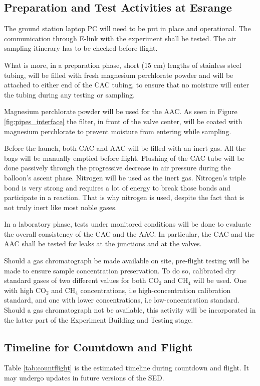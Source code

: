 \documentclass[a4paper,12pt,twoside]{article}
\begin{document}
\subsection{Preparation and Test Activities at Esrange}
The ground station laptop PC will need to be put in place and operational. The communication through E-link with the experiment shall be tested. The air sampling itinerary has to be checked before flight.

What is more, in a preparation phase, short (15 cm) lengths of stainless steel tubing, will be filled with fresh magnesium perchlorate powder \cite{Karion} and will be attached to either end of the CAC tubing, to ensure that no moisture will enter the tubing during any testing or sampling.

Magnesium perchlorate powder will be used for the AAC. As seen in Figure \ref{fig:pipes_interface} the filter, in front of the valve center, will be coated with magnesium perchlorate to prevent moisture from entering while sampling. 

Before the launch, both CAC and AAC will be filled with  an inert gas. All the bags will be manually emptied before flight. Flushing of the CAC tube will be done passively through the progressive decrease in air pressure during the balloon's ascent phase. Nitrogen will be used as the inert gas. Nitrogen's triple bond is very strong and requires a lot of energy to break those bonds and participate in a reaction. That is why nitrogen is used, despite the fact that is not truly inert like most noble gases.

In a laboratory phase, tests under monitored conditions will be done to evaluate the overall consistency of the CAC and the AAC. In particular, the CAC and the AAC shall be tested for leaks at the junctions and at the valves. 

Should a gas chromatograph be made available on site, pre-flight testing will be made to ensure sample concentration preservation. To do so, calibrated dry standard gases of two different values for both CO$_2$ and CH$_4$ will be used. One with high CO$_2$ and CH$_4$ concentrations, i.e high-concentration calibration standard, and one with lower concentrations, i.e low-concentration standard. Should a gas chromatograph not be available, this activity will be incorporated in the latter part of the Experiment Building and Testing stage.
\pagebreak
\subsection{Timeline for Countdown and Flight}
Table \ref{tab:countflight} is the estimated timeline during countdown and flight. It may undergo updates in future versions of the SED.
\end{document}
